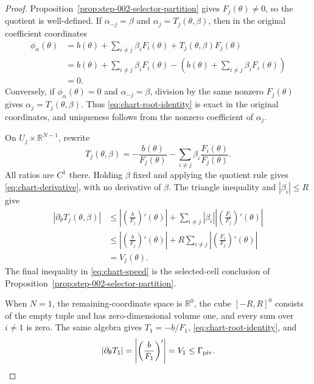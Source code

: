 \begin{proof}
Proposition~\ref{prop:step-002-selector-partition} gives
$F_j(\theta)\neq0$, so the quotient is well-defined.  If
$\alpha_{-j}=\beta$ and $\alpha_j=T_j(\theta,\beta)$, then in the original
coefficient coordinates
\begin{equation}
\begin{aligned}
\phi_\alpha(\theta)
&=b(\theta)+\sum_{i\neq j}\beta_iF_i(\theta)
  +T_j(\theta,\beta)F_j(\theta)\\
&=b(\theta)+\sum_{i\neq j}\beta_iF_i(\theta)
 -\left(b(\theta)+\sum_{i\neq j}\beta_iF_i(\theta)\right)\\
&=0.
\end{aligned}
\label{eq:chart-root-identity}
\end{equation}
Conversely, if $\phi_\alpha(\theta)=0$ and $\alpha_{-j}=\beta$, division by
the same nonzero $F_j(\theta)$ gives
$\alpha_j=T_j(\theta,\beta)$.  Thus
\eqref{eq:chart-root-identity} is exact in the original coordinates, and
uniqueness follows from the nonzero coefficient of $\alpha_j$.

On $U_j\times\mathbb R^{N-1}$, rewrite
\[
T_j(\theta,\beta)
=-\frac{b(\theta)}{F_j(\theta)}
-\sum_{i\neq j}\beta_i\frac{F_i(\theta)}{F_j(\theta)}.
\]
All ratios are $C^1$ there.  Holding $\beta$ fixed and applying the quotient
rule gives \eqref{eq:chart-derivative}, with no derivative of $\beta$.  The
triangle inequality and $|\beta_i|\leq R$ give
\[
\begin{aligned}
|\partial_\theta T_j(\theta,\beta)|
&\leq
\left|\left(\frac b{F_j}\right)'(\theta)\right|
+\sum_{i\neq j}|\beta_i|
 \left|\left(\frac{F_i}{F_j}\right)'(\theta)\right|\\
&\leq
\left|\left(\frac b{F_j}\right)'(\theta)\right|
+R\sum_{i\neq j}
 \left|\left(\frac{F_i}{F_j}\right)'(\theta)\right|\\
&=V_j(\theta).
\end{aligned}
\]
The final inequality in \eqref{eq:chart-speed} is the selected-cell
conclusion of Proposition~\ref{prop:step-002-selector-partition}.

When $N=1$, the remaining-coordinate space is $\mathbb R^0$, the cube
$[-R,R]^0$ consists of the empty tuple and has zero-dimensional volume one,
and every sum over $i\neq1$ is zero.  The same algebra gives
$T_1=-b/F_1$, \eqref{eq:chart-root-identity}, and
\[
|\partial_\theta T_1|
=\left|\left(\frac b{F_1}\right)'\right|
=V_1\leq\Gamma_{\rm piv}.
\]
\end{proof}

